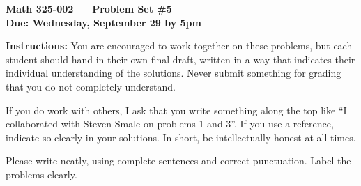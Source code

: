 \documentclass{amsart}
\begin{document}
\begin{center}
{\large\bfseries
Math 325-002 --- Problem Set \#5 \\
Due: Wednesday, September 29 by 5pm}
\end{center}





{\bf Instructions:} You are encouraged to work together on these
problems, but each student should hand in their own final draft,
written in a way that indicates their individual understanding of
the solutions. Never submit something for grading
that you do not completely understand. 

If you do work with others, I ask that you write something along the
top like ``I collaborated with Steven Smale on problems 1 and 3''.
If you use a reference, indicate so clearly in your solutions. 
In short, be intellectually
honest at all times.

Please write neatly, using complete sentences and correct
punctuation. Label the problems clearly. 
\end{document}
